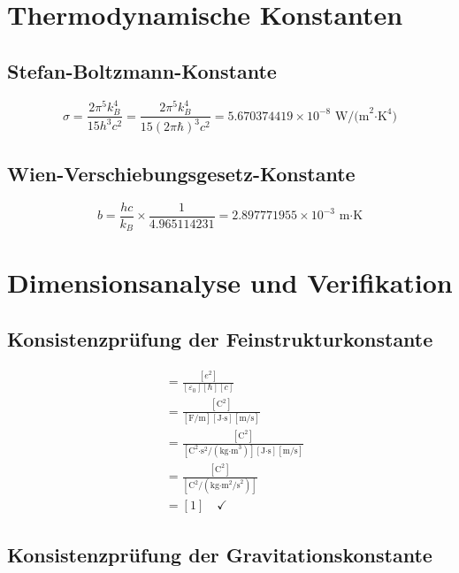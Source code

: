 	\section{Thermodynamische Konstanten}
	
	\subsection{Stefan-Boltzmann-Konstante}
	
	\begin{equation}
		\sigma = \frac{2\pi^5 k_B^4}{15 h^3 c^2} = \frac{2\pi^5 k_B^4}{15 (2\pi\hbar)^3 c^2} = 5.670374419 \times 10^{-8} \text{ W/(m}^2\text{·K}^4\text{)}
	\end{equation}
	
	\subsection{Wien-Verschiebungsgesetz-Konstante}
	
	\begin{equation}
		b = \frac{hc}{k_B} \times \frac{1}{4.965114231} = 2.897771955 \times 10^{-3} \text{ m·K}
	\end{equation}
	
	\section{Dimensionsanalyse und Verifikation}
	
	\subsection{Konsistenzprüfung der Feinstrukturkonstante}
	
	\begin{align}
		[\alpha] &= \frac{[e^2]}{[\varepsilon_0][\hbar][c]}\\
		&= \frac{[\text{C}^2]}{[\text{F/m}][\text{J·s}][\text{m/s}]}\\
		&= \frac{[\text{C}^2]}{[\text{C}^2\text{·s}^2/(\text{kg·m}^3)][\text{J·s}][\text{m/s}]}\\
		&= \frac{[\text{C}^2]}{[\text{C}^2/(\text{kg·m}^2\text{/s}^2)]}\\
		&= [1] \quad \checkmark
	\end{align}
	
	\subsection{Konsistenzprüfung der Gravitationskonstante}
	
